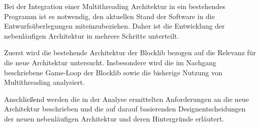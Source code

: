 Bei der Integration einer Multithreading Architektur in ein bestehendes \gls{Programm} ist es notwendig, den aktuellen Stand der Software in die Entwurfsüberlegungen miteinzubeziehen. Daher ist die Entwicklung der nebenläufigen Architektur in mehrere Schritte unterteilt.

Zuerst wird die bestehende Architektur der Blocklib bezogen auf die Relevanz für die neue Architektur untersucht. Insbesondere wird die im Nachgang beschriebene Game-Loop der Blocklib sowie die bisherige Nutzung von Multithreading analysiert.

Anschließend werden die in der Analyse ermittelten Anforderungen an die neue Architektur beschrieben und die auf darauf basierenden Designentscheidungen der neuen nebenläufigen Architektur und deren Hintergründe erläutert.